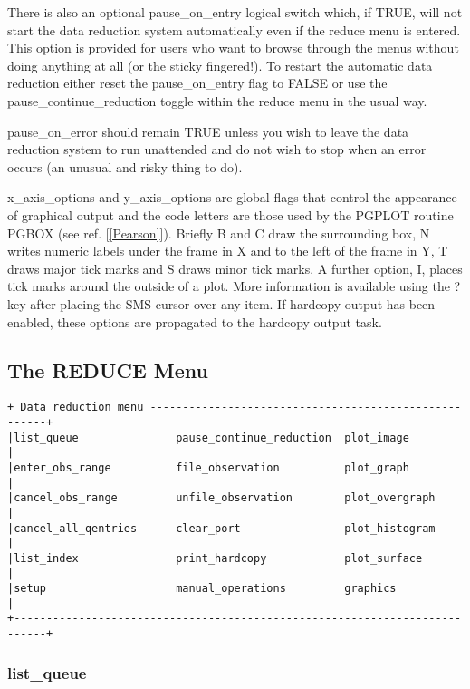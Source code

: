 {There is also an optional {\sf pause\_on\_entry} logical switch which, 
if {\sf TRUE}, will not start the data reduction system automatically even if 
the {\sf reduce} menu is entered. This option is provided for users who want 
to browse through the menus without doing anything at all (or the sticky 
fingered!). To restart the automatic data reduction either reset the 
{\sf pause\_on\_entry} flag to {\sf FALSE} or use the 
{\sf pause\_continue\_reduction} toggle within the {\sf reduce} menu 
in the usual way.

{\sf pause\_on\_error}  should remain {\sf TRUE} unless you wish
to leave the data reduction system to run unattended and do not wish to stop 
when an error occurs (an unusual and risky thing to do).

{\sf x\_axis\_options} and {\sf y\_axis\_options} are global flags that
control the appearance of graphical output and the code letters are those
used by the PGPLOT routine PGBOX (see ref. [\ref{Pearson}]). Briefly B and C
draw the surrounding box, N writes numeric labels under the frame in X and
to the left of the frame in Y, T draws major tick marks and S draws minor 
tick marks. A further option, I, places tick marks around the outside of a plot.
More information is available using the {\sf ?} key after placing the SMS 
cursor over any item. If hardcopy output has been enabled, these options are
propagated to the hardcopy output task.

\subsection{The REDUCE Menu}
\label{the_reduce_menu}
\begin{verbatim}
+ Data reduction menu ------------------------------------------------------+
|list_queue               pause_continue_reduction  plot_image              |
|enter_obs_range          file_observation          plot_graph              |
|cancel_obs_range         unfile_observation        plot_overgraph          |
|cancel_all_qentries      clear_port                plot_histogram          |
|list_index               print_hardcopy            plot_surface            |
|setup                    manual_operations         graphics                |
+---------------------------------------------------------------------------+
\end{verbatim}

\subsubsection{list\_queue}
\label{list_queue}

}
